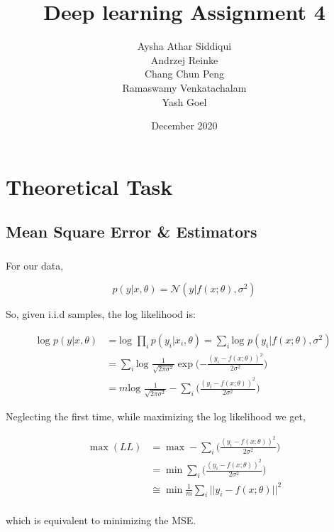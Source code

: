 \documentclass{article}
\title{Deep learning Assignment 4}
\author{Aysha Athar Siddiqui\\
Andrzej Reinke\\
Chang Chun Peng\\
Ramaswamy Venkatachalam\\
Yash Goel
}
\date{December 2020}
\begin{document}
\maketitle
\section{Theoretical Task }

\subsection{Mean Square Error \& Estimators}
\subsubsection{}
For our data,

\begin{equation*}
    p(y|x,\theta) = \mathcal{N}(y|f(x;\theta), \sigma^2)
\end{equation*}

So, given i.i.d samples, the log likelihood is:

\begin{align*}
    \text{log } p(y|x,\theta) &= \text{log } \prod_{i} p(y_{i}|x_{i},\theta) = \sum_{i}\text{log }p(y_{i}|f(x;\theta), \sigma^2)\\
    &= \sum_{i}\text{log }\frac{1}{\sqrt{2\pi\sigma^{2}}}\exp\Big({-\frac{(y_{i} - f(x;\theta))^{2}}{2\sigma^{2}}}\Big)\\
    &= m\text{log }\frac{1}{\sqrt{2\pi\sigma^{2}}} - \sum_{i}\Big({\frac{(y_{i} - f(x;\theta))^{2}}{2\sigma^{2}}}\Big)
\end{align*}

Neglecting the first time, while maximizing the log likelihood we get,

\begin{align*}
    \max (LL) &= \max - \sum_{i}\Big({\frac{(y_{i} - f(x;\theta))^{2}}{2\sigma^{2}}}\Big)\\
    &= \min \sum_{i}\Big({\frac{(y_{i} - f(x;\theta))^{2}}{2\sigma^{2}}}\Big)\\
    & \cong \min \frac{1}{m}\sum_{i}{||y_{i} - f(x;\theta)||^2}\\
\end{align*}

which is equivalent to minimizing the MSE.

\subsubsection{}
\end{document}
